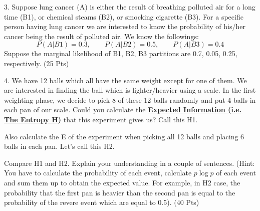 \vspace{2em}

3. Suppose lung cancer (A) is either the result of breathing polluted air for a long time (B1), or chemical steams (B2), or smocking cigarette (B3). For a specific person having lung cancer we are interested to know the probability of his/her cancer being the result of polluted air. We know the followings:
\[
P(A|B1) = 0.3, \qquad P(A|B2) = 0.5, \qquad P(A|B3) = 0.4
\]
Suppose the marginal likelihood of B1, B2, B3 partitions are 0.7, 0.05, 0.25, respectively. (25 Pts)

\vspace{2em}

4. We have 12 balls which all have the same weight except for one of them. We are interested in finding the ball which is lighter/heavier using a scale. In the first weighting phase, we decide to pick 8 of these 12 balls randomly and put 4 balls in each pan of our scale. Could you calculate the \underline{\textbf{Expected Information (i.e. The Entropy H)}} that this experiment gives us? Call this H1.

Also calculate the E of the experiment when picking all 12 balls and placing 6 balls in each pan. Let's call this H2.

Compare H1 and H2. Explain your understanding in a couple of sentences. (Hint: You have to calculate the probability of each event, calculate $p \log p$ of each event and sum them up to obtain the expected value. For example, in H2 case, the probability that the first pan is heavier than the second pan is equal to the probability of the revere event which are equal to 0.5). (40 Pts)
\RTL